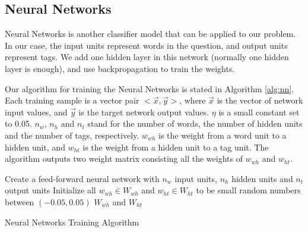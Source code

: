 
\subsection{Neural Networks}

Neural Networks is another classifier model that can be applied to our problem. In our case, the input units represent words in the question, and output units represent tags. We add one hidden layer in this network (normally one hidden layer is enough), and use backpropagation to train the weights. 

Our algorithm for training the Neural Networks is stated in Algorithm \ref{alg:nn}. Each training sample is a vector pair $<\overrightarrow{x},\overrightarrow{y}>$, where $\overrightarrow{x}$ is the vector of network input values, and $\overrightarrow{y}$ is the target network output values. $\eta$ is a small constant set to 0.05. $n_w$, $n_h$ and $n_t$ stand for the number of words, the number of hidden units and the number of tags, respectively. $w_{wh}$ is the weight from a word unit to a hidden unit, and $w_{ht}$ is the weight from a hidden unit to a tag unit. The algorithm outputs two weight matrix consisting all the weights of $w_{wh}$ and $w_{ht}$.

\IncMargin{1em}
\begin{algorithm}
\label{alg:nn}
\BlankLine
Create a feed-forward neural network with $n_w$ input units, $n_h$ hidden units and $n_t$ output units\;
Initialize all $w_{wh} \in W_{wh}$ and $w_{ht} \in W_{ht}$ to be small random numbers between $(-0.05, 0.05)$\;
\Return $W_{wh}$ and $W_{ht}$ \;

\caption{Neural Networks Training Algorithm}\label{algo_disjdecomp}
\end{algorithm}\DecMargin{1em}
